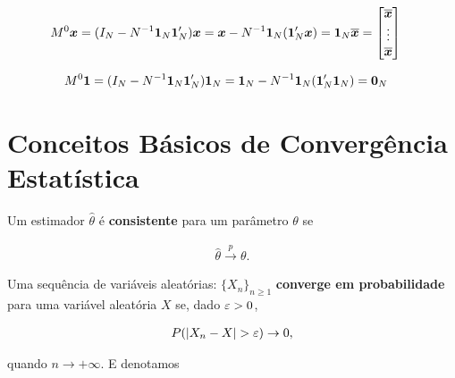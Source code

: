 \documentclass[11pt, oneside, a4paper, article]{article}
\numberwithin{equation}{section}
\begin{document}
\begin{description}
\begin{description}
\vspace{-1 em}
\begin{align*}
M^{0} \boldsymbol{x} &= 
( I_{N} - N^{-1} \boldsymbol{1}_{N} \boldsymbol{1}_{N}' ) \boldsymbol{x} 
= 
\boldsymbol{x} - N^{-1} \boldsymbol{1}_{N} (\boldsymbol{1}_{N}' \boldsymbol{x}) 
=
\boldsymbol{1}_{N} \overline{\boldsymbol{x}}
=
\begin{bmatrix}
\overline{\boldsymbol{x}} \\ \vdots \\ \overline{\boldsymbol{x}}
\end{bmatrix}
\end{align*}

\vspace{-1 em}
\begin{align*}
M^{0} \boldsymbol{1} &= 
( I_{N} - N^{-1} \boldsymbol{1}_{N} \boldsymbol{1}_{N}' ) \boldsymbol{1}_{N}
= 
\boldsymbol{1}_{N} - N^{-1} \boldsymbol{1}_{N} (\boldsymbol{1}_{N}' \boldsymbol{1}_{N}) 
=
\boldsymbol{0}_{N} 
\end{align*}

\clearpage
\section{Conceitos Básicos de Convergência Estatística} \label{app1}

\begin{defn}
Um estimador $\hat{\theta}$ é \textbf{consistente} para um parâmetro $\theta$ se 

\vspace{-1 em}
\begin{align*}
\hat{\theta} \overset{p}{\longrightarrow} \theta.
\end{align*}
\end{defn}

\begin{defn}
Uma sequência de variáveis aleatórias:
$\{ X_{n} \}_{n \geq 1}$ 
\textbf{converge em probabilidade} para uma variável aleatória $X$ se, dado $\varepsilon > 0$, 

\vspace{-1 em}
\begin{align*}
	P(| X_{n} - X | > \varepsilon ) \to 0,
\end{align*}

\noindent
quando $n \to + \infty$.
E denotamos


\end{defn}
\end{description}
\end{description}
\end{document}
